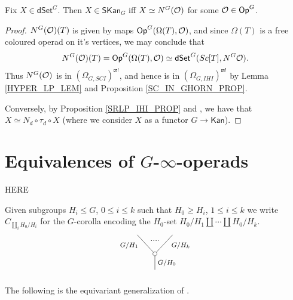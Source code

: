 \documentclass[a4paper,10pt,draft]{article}%
\begin{document}
\begin{corollary}
      Fix $X \in \mathsf{dSet}^G$. Then
      $X \in \mathsf{SKan}_G$ iff $X \simeq N^G(\mathcal{O})$ for some $\mathcal{O} \in \mathsf{Op}^G$.
\end{corollary}
\begin{proof}
      $N^G(\mathcal{O})(T)$ is given by maps $\mathsf{Op}^G(\Omega(T), \mathcal{O})$,
      and since $\Omega(T)$ is a free coloured operad on it's vertices, we may conclude that
      \begin{equation}
            N^G(\mathcal{O})(T) = \mathsf{Op}^G(\Omega(T), \mathcal{O}) \simeq \mathsf{dSet}^G(Sc[T], N^G\mathcal{O}).
      \end{equation}
      Thus $N^G(\mathcal{O})$ is in $(\Omega_{G, SCI})^{\boxslash !}$, and hence is in $(\Omega_{G,IHI})^{\boxslash !}$
      by Lemma \ref{HYPER_LP_LEM} and Proposition \ref{SC_IN_GHORN_PROP}.

      Conversely, by Proposition \ref{SRLP_IHI_PROP} and \cite[Theorem 6.1, Proposition 6.10]{MW09}, we have that
      $X \simeq N_d \circ \tau_d \circ X$
      (where we consider $X$ as a functor $G \to \mathsf{Kan}$).
\end{proof}



\newpage

\section{Equivalences of $G$-$\infty$-operads}

{\color{red} HERE}

\begin{notation}
Given subgroups $H_i \leq G$, $0\leq i \leq k$ such that
$H_0 \geq H_i$, $1 \leq i \leq k$ we write
$C_{\amalg_i H_0/H_i}$ for the $G$-corolla encoding the 
$H_0$-set $H_0/H_1 \amalg \cdots \amalg H_0/H_k$.
\[
\begin{tikzpicture}
[grow=up,auto,level distance=2.3em,every node/.style = {font=\footnotesize},dummy/.style={circle,draw,inner sep=0pt,minimum size=1.75mm}]
	\node at (0,0) {}
		child{node [dummy] {}
			child{
			edge from parent node [swap,near end] {$G/H_k$} node [name=Kn] {}}
			child{
			edge from parent node [near end] {$G/H_1$}
node [name=Kone,swap] {}}
		edge from parent node [swap] {$G/H_0$}
		};
		\draw [dotted,thick] (Kone) -- (Kn) ;
\end{tikzpicture}
\]
\end{notation}




The following is the equivariant generalization of 
\cite[Thm. 3.5]{CM13a}.
\end{document}
